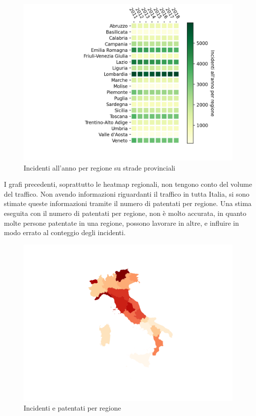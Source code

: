 \documentclass[a4paper]{report}
\begin{document}
\begin{figure}
    \includegraphics[width=\linewidth]{../src/incidenti/incidenti_aci/mappe_regioni/regioni_heatmap.png}
    \caption{Incidenti all'anno per regione su strade provinciali}
    \label{fig:regione-heatmap}
\end{figure}

I grafi precedenti, soprattutto le heatmap regionali, non tengono conto del 
volume del traffico.
Non avendo informazioni riguardanti il traffico in tutta Italia, si sono stimate 
queste informazioni tramite il numero di patentati per regione.
Una stima eseguita con il numero di patentati per regione, non è molto accurata, 
in quanto molte persone patentate in una regione, possono lavorare in altre, e 
influire in modo errato al conteggio degli incidenti. 

\begin{figure}
    \includegraphics[width=\linewidth]{../src/incidenti/incidenti_aci/mappe_regioni/incidenti_patenti_italia.png}
    \caption{Incidenti e patentati per regione}
    \label{fig:incidenti-patentati}
\end{figure}
\end{document}
